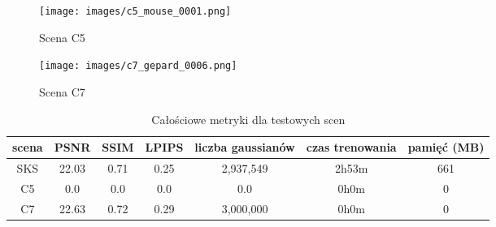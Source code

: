 \begin{figure}[!h]
    \centering
    \texttt{[image: images/c5\_mouse\_0001.png]}
    \caption{Scena C5}
    \label{fig:c5_gs}
\end{figure}

\begin{figure}[!h]
    \centering
    \texttt{[image: images/c7\_gepard\_0006.png]}
    \caption{Scena C7}
    \label{fig:c7_gs}
\end{figure}

\begin{table}[!h]
    \centering
    \begin{tabular}{|c|c|c|c|c|c|c|}
    \hline
    scena & PSNR & SSIM & LPIPS & liczba gaussianów & czas trenowania & pamięć (MB) \\
    \hline 
    SKS & 22.03 & 0.71 & 0.25 & 2,937,549 & 2h53m & 661 \\
    \hline 
    C5 & 0.0 & 0.0 & 0.0 & 0.0 & 0h0m & 0\\
    \hline 
    C7 & 22.63 & 0.72 & 0.29 & 3,000,000 & 0h0m & 0\\
    \hline
    \end{tabular}
\caption{Całościowe metryki dla testowych scen}
\label{table:tab_conf_sks}
\end{table}
